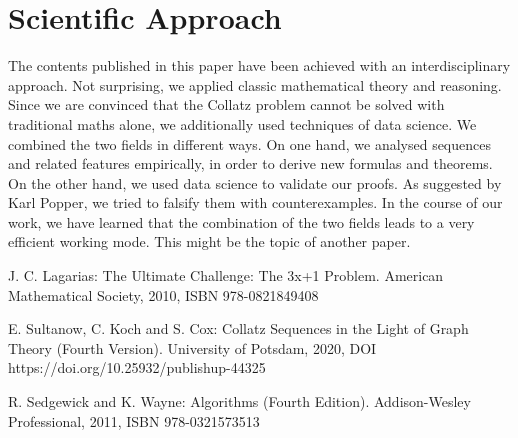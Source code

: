 \documentclass{SciPress_2015}
\begin{document}
\section{Scientific Approach}
\label{appx:scientific_approach}
The contents published in this paper have been achieved with an interdisciplinary approach. Not surprising, we applied classic mathematical theory and reasoning. Since we are convinced that the Collatz problem cannot be solved with traditional maths alone, we additionally used techniques of data science. We combined the two fields in different ways. On one hand, we analysed sequences and related features empirically, in order to derive new formulas and theorems. On the other hand, we used data science to validate our proofs. As suggested by Karl Popper, we tried to falsify them with counterexamples. In the course of our work, we have learned that the combination of the two fields leads to a very efficient working mode. This might be the topic of another paper.

\begin{thebibliography}{99}

J. C. Lagarias: The Ultimate Challenge: The 3x+1 Problem. American Mathematical Society, 2010, ISBN 978-0821849408

E. Sultanow, C. Koch and S. Cox: Collatz Sequences in the Light of Graph Theory (Fourth Version). University of Potsdam, 2020, DOI https://doi.org/10.25932/publishup-44325

R. Sedgewick and K. Wayne: Algorithms (Fourth Edition). Addison-Wesley Professional, 2011, ISBN 978-0321573513

\end{thebibliography}
\end{document}
